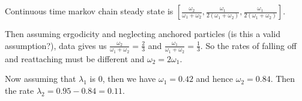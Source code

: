 \documentclass[a4paper,10pt]{article}
\begin{document}
Continuous time markov chain steady state is $[\frac{\omega_2 }{\omega_1 + \omega_2},\frac{ \omega_1}{2(\omega_1+\omega_2)}, \frac{\omega_1}{2(\omega_1+\omega_2)}]$. 

Then assuming ergodicity and neglecting anchored particles (is this a valid assumption?), data gives us $\frac{\omega_2 }{\omega_1 + \omega_2} = \frac{2}{3}$ and $\frac{\omega_1 }{\omega_1 + \omega_2} = \frac{1}{3}$.
So the rates of falling off and reattaching must be different and $\omega_2 = 2 \omega_1$.

Now assuming that $\lambda_1$ is 0, then we have $\omega_1 = 0.42$ and hence $\omega_2 = 0.84$. 
Then the rate $\lambda_2 = 0.95-0.84 = 0.11$. 
 



\end{document}
